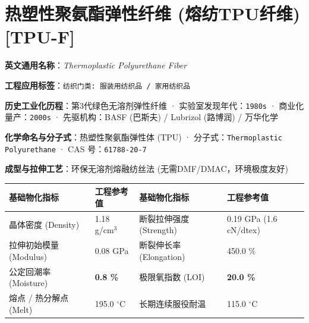 \documentclass[11pt,openright,twoside,UTF8]{ctexbook}
\begin{document}
\section{热塑性聚氨酯弹性纤维 (熔纺TPU纤维) [TPU-F]}
\label{sec:tpu-f}

\noindent\textbf{英文通用名称}：\textit{Thermoplastic Polyurethane Fiber}\par
\noindent\textbf{工程应用标签}：\texttt{纺织门类: 服装用纺织品 / 家用纺织品}\par
\noindent\textbf{历史工业化历程}：第3代绿色无溶剂弹性纤维 · 实验室发现年代：\texttt{1980s} · 商业化量产：\texttt{2000s} · 先驱机构：BASF (巴斯夫) / Lubrizol (路博润) / 万华化学\par
\noindent\textbf{化学命名与分子式}：热塑性聚氨酯弹性体 (TPU) · 分子式：\texttt{Thermoplastic Polyurethane} · CAS 号：\texttt{61788-20-7}\par
\noindent\textbf{成型与拉伸工艺}：环保无溶剂熔融纺丝法 (无需DMF/DMAC，环境极度友好)\par

\vspace{0.15cm}
\begin{center}
\small
\begin{tabularx}{\textwidth}{p{3.8cm}Xp{3.8cm}X}
\toprule
\textbf{基础物化指标} & \textbf{工程参考值} & \textbf{基础物化指标} & \textbf{工程参考值} \\
\midrule
晶体密度 (Density) & 1.18 g/cm$^3$ & 断裂拉伸强度 (Strength) & 0.19 GPa (1.6 cN/dtex) \\
拉伸初始模量 (Modulus) & 0.08 GPa & 断裂伸长率 (Elongation) & 450.0 \% \\
公定回潮率 (Moisture) & \textbf{0.8 \%} & 极限氧指数 (LOI) & \textbf{20.0 \%} \\
熔点 / 热分解点 (Melt) & 195.0 $^\circ\mathrm{C}$ & 长期连续服役耐温 & 115.0 $^\circ\mathrm{C}$ \\
\bottomrule
\end{tabularx}
\end{center}
\vspace{0.15cm}
\end{document}

